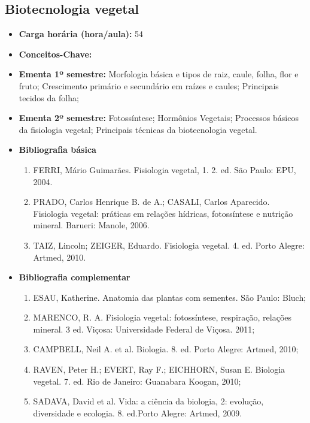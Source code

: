 \documentclass[11pt,fleqn]{book} %
\begin{document}
\subsection{Biotecnologia vegetal}\label{disc:biotecVegetal}
\begin{itemize}
	\item \textbf{Carga horária (hora/aula):} 54
	\item \textbf{Conceitos-Chave:}
	\item \textbf{Ementa 1º semestre:}
	Morfologia básica e tipos de raiz, caule, folha, flor e fruto; 
	Crescimento primário e secundário em raízes e caules; 
	Principais tecidos da folha;	
	\item \textbf{Ementa 2º semestre:}	
	Fotossíntese; 
	Hormônios Vegetais; 
	Processos básicos da fisiologia vegetal; 
	Principais técnicas da biotecnologia vegetal.
	\item \textbf{Bibliografia básica}
	\begin{enumerate}
		\item FERRI, Mário Guimarães. Fisiologia vegetal, 1. 2. ed. São Paulo: EPU, 2004. 
		\item PRADO, Carlos Henrique B. de A.; CASALI, Carlos Aparecido.  Fisiologia vegetal: práticas em relações hídricas, fotossíntese e nutrição mineral. Barueri: Manole, 2006.
		\item TAIZ, Lincoln; ZEIGER, Eduardo. Fisiologia vegetal. 4. ed. Porto Alegre: Artmed, 2010.
	\end{enumerate}
	\item \textbf{Bibliografia complementar}
	\begin{enumerate}
		\item ESAU, Katherine. Anatomia das plantas com sementes. São Paulo: Bluch;
		\item MARENCO, R. A. Fisiologia vegetal: fotossíntese, respiração, relações mineral. 3 ed. Viçosa: Universidade Federal de Viçosa. 2011;
		\item CAMPBELL, Neil A. et al. Biologia. 8. ed. Porto Alegre: Artmed, 2010;
		\item RAVEN, Peter H.; EVERT, Ray F.; EICHHORN, Susan E. Biologia vegetal. 7. ed. Rio de Janeiro: Guanabara Koogan, 2010;
		\item SADAVA, David et al. Vida: a ciência da biologia, 2: evolução, diversidade e ecologia. 8. ed.Porto Alegre: Artmed, 2009.
	\end{enumerate}	
\end{itemize}

\newpage
\end{document}
